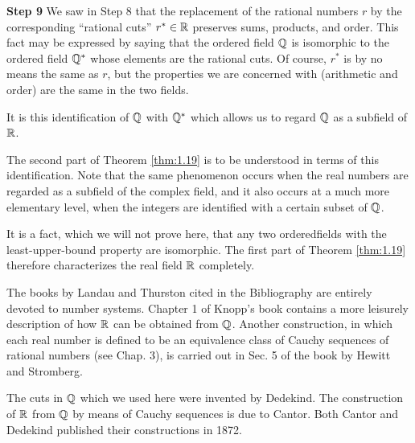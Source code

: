\textbf{Step 9} We saw in Step 8 that the replacement of the rational numbers $r$ by the corresponding ``rational cuts'' $r^* \in {\protect\mathbb R}$ preserves sums, products, and order. This fact may be expressed by saying that the ordered field ${\protect\mathbb Q} $ is isomorphic to the ordered field ${\protect\mathbb Q} ^*$ whose elements are the rational cuts. Of course, $r^*$ is by no means the same as $r$, but the properties we are concerned with (arithmetic and order) are the same in the two fields.

It is this identification of ${\protect\mathbb Q} $ with ${\protect\mathbb Q} ^*$ which allows us to regard ${\protect\mathbb Q} $ as a subfield of ${\protect\mathbb R}$.

The second part of Theorem \ref{thm:1.19} is to be understood in terms of this identification. Note that the same phenomenon occurs when the real numbers are regarded as a subfield of the complex field, and it also occurs at a much more elementary level, when the integers are identified with a certain subset of ${\protect\mathbb Q} $.

It is a fact, which we will not prove here, that any two orderedfields with the least-upper-bound property are isomorphic. The first part of Theorem \ref{thm:1.19} therefore characterizes the real field ${\protect\mathbb R}$ completely.

The books by Landau and Thurston cited in the Bibliography are entirely devoted to number systems. Chapter 1 of Knopp's book contains a more leisurely description of how ${\protect\mathbb R}$ can be obtained from ${\protect\mathbb Q} $. Another construction, in which each real number is defined to be an equivalence class of Cauchy sequences of rational numbers (see Chap. 3), is carried out in Sec. 5 of the book by Hewitt and Stromberg.

The cuts in ${\protect\mathbb Q} $ which we used here were invented by Dedekind. The construction of ${\protect\mathbb R}$ from ${\protect\mathbb Q} $ by means of Cauchy sequences is due to Cantor. Both Cantor and Dedekind published their constructions in 1872.
